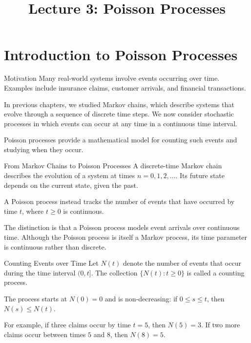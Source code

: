 \documentclass[
  ignorenonframetext,
  aspectratio=169,
]{beamer}
\title{\texorpdfstring{Lecture 3: Poisson
Processes}{Lecture 3: Poisson Processes}}
\author{}
\date{}
\begin{document}
\frame{\titlepage}


\section{Introduction to Poisson
Processes}\label{introduction-to-poisson-processes}

\begin{frame}{Motivation}
\protect{}\label{motivation}
Many real-world systems involve events occurring over time. Examples
include insurance claims, customer arrivals, and financial transactions.

In previous chapters, we studied Markov chains, which describe systems
that evolve through a sequence of discrete time steps. We now consider
stochastic processes in which events can occur at any time in a
continuous time interval.

Poisson processes provide a mathematical model for counting such events
and studying when they occur.
\end{frame}

\begin{frame}{From Markov Chains to Poisson Processes}
\protect{}\label{from-markov-chains-to-poisson-processes}
A discrete-time Markov chain describes the evolution of a system at
times \(n=0,1,2,\ldots\). Its future state depends on the current state,
given the past.

A Poisson process instead tracks the number of events that have occurred
by time \(t\), where \(t\geq 0\) is continuous.

The distinction is that a Poisson process models event arrivals over
continuous time. Although the Poisson process is itself a Markov
process, its time parameter is continuous rather than discrete.
\end{frame}

\begin{frame}{Counting Events over Time}
\protect{}\label{counting-events-over-time}
Let \(N(t)\) denote the number of events that occur during the time
interval \((0,t]\). The collection \(\{N(t):t\geq 0\}\) is called a
counting process.

The process starts at \(N(0)=0\) and is non-decreasing: if
\(0\leq s\leq t\), then \(N(s)\leq N(t)\).

For example, if three claims occur by time \(t=5\), then \(N(5)=3\). If
two more claims occur between times \(5\) and \(8\), then \(N(8)=5\).
\end{frame}
\end{document}
